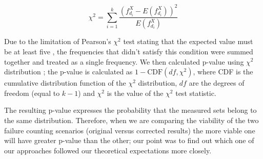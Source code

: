 \documentclass[
	digital,    %
	oneside,
	color,
	11pt,
	nocover,
	notable,
	nolof,
	nolot,
]{fithesis3}
\theoremstyle{definition}
\theoremstyle{remark}
\begin{document}
\begin{equation}
\label{eq:chi_square_stat}
\chi^2 = \sum\limits_{i=1}^{k} \frac{  \left(f_{d_i}^{X} - E \left(f_{d_i}^{X}\right) \right)^2 }{E \left(f_{d_i}^{X}\right)}
\end{equation}

Due to the limitation of Pearson's $\chi^2$ test stating that the expected value must be at least five \cite[p.~220]{stat-handbook}, the frequencies that didn't satisfy this condition were summed together and treated as a single frequency. We then calculated p-value using $\chi^2$ distribution \cite[p.~116]{stat-handbook}; the p-value is calculated as $1 - \text{CDF}(df, \chi^2)$, where CDF is the cumulative distribution function of the $\chi^2$ distribution, $df$ are the degrees of freedom (equal to $k-1$) and $\chi^2$ is the value of the $\chi^2$ test statistic.

The resulting p-value expresses the probability that the measured sets belong to the same distribution. Therefore, when we are comparing the viability of the two failure counting scenarios (original versus corrected results) the more viable one will have greater p-value than the other; our point was to find out which one of our approaches followed our theoretical expectations more closely.
\end{document}
